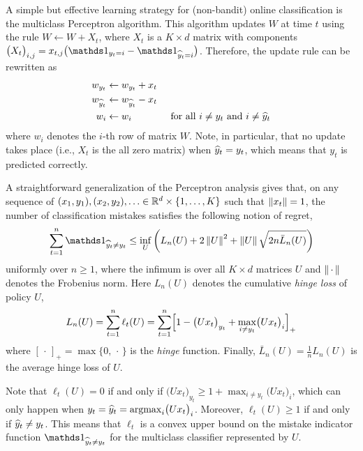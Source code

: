A simple but effective learning strategy for (non-bandit) online classification is the multiclass Perceptron algorithm. This algorithm updates $W$ at time $t$ using the rule $W \leftarrow W + X_t$, where
$X_t$ is a $K \times d$ matrix with components $\bigl(X_t\bigr)_{i,j} = x_{t,j}\bigl(\ds1_{y_t=i} - \ds1_{\yhat_t=i}\bigr)$. Therefore, the update rule can be rewritten as
\begin{align*}
    w_{y_t} &\leftarrow w_{y_t} + x_t
\\
    w_{\widehat{y}_t} &\leftarrow w_{\widehat{y}_t} - x_t
\\
    w_i &\leftarrow w_i \qquad\qquad \text{for all $i \neq y_t$ and $i \neq \widehat{y}_t$}
\end{align*}
where $w_i$ denotes the $i$-th row of matrix $W$.
Note, in particular, that no update takes place (i.e., $X_t$ is the all zero matrix) when $\widehat{y}_t = y_t$, which means that $y_t$ is predicted correctly.

A straightforward generalization of the Perceptron analysis gives that, on any sequence of $(x_1,y_1),(x_2,y_2),\ldots\in\mathbb{R}^d\times\{1,\dots,K\}$ such that $\left\|{x_t}\right\| =1$, the number of classification mistakes satisfies the following notion of regret,
\[
    \sum_{t=1}^n \ds1_{\yhat_t \neq y_t}
\le
    \inf_{U} \left( L_n(U) + 2\norm{U}^2 + \norm{U}\sqrt{2n\bar{L}_n(U)} \right)
\]
uniformly over $n \ge 1$, where the infimum is over all $K \times d$ matrices $U$ and $\left\|{\,\cdot\,}\right\|$ denotes the Frobenius norm. Here $L_n(U)$ denotes the cumulative \textsl{hinge loss} of policy $U$,
\[
    L_n(U) = \sum_{t=1}^n \ell_t(U) = \sum_{t=1}^n \Bigl[1 - \bigl(Ux_t\bigr)_{y_t} + \max_{i \neq y_t}\bigl(Ux_t\bigr)_i \Bigr]_+
\]
where $[\,\cdot\,]_+ = \max\{0,\,\cdot\,\}$ is the \textsl{hinge} function. Finally, $\bar{L}_n(U) = \tfrac{1}{n}L_n(U)$ is the average hinge loss of $U$.

Note that $\ell_t(U) = 0$ if and only if $\bigl(Ux_t\bigr)_{y_t} \ge 1 + \max_{i \neq y_t}\bigl(Ux_t\bigr)_i$, which can only happen when $y_t = \widehat{y}_t = \mathop{\mathrm{argmax}}_{i}\bigl(Ux_t\bigr)_i$. Moreover, $\ell_t(U) \ge 1$ if and only if $\widehat{y}_t \neq y_t$. This means that $\ell_t$ is a convex upper bound on the mistake indicator function $\ds1_{\yhat_t \neq y_t}$ for the multiclass classifier represented by $U$.


